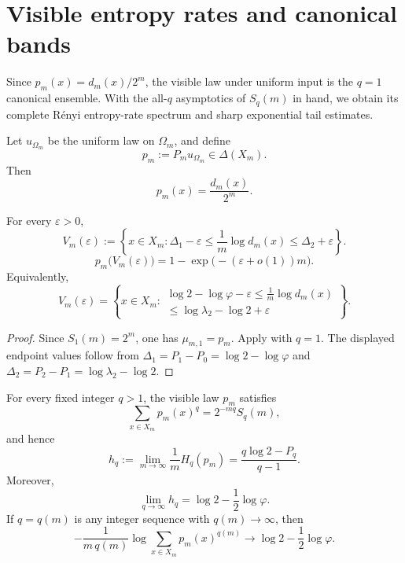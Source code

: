 \section{Visible entropy rates and canonical bands}\label{sec:ledger}

Since \(p_m(x)=d_m(x)/2^m\), the visible law under uniform input is the
\(q=1\) canonical ensemble.  With the all-\(q\) asymptotics of \(S_q(m)\) in
hand, we obtain its complete R\'enyi entropy-rate spectrum
\cite{CoverThomas2006} and sharp exponential tail estimates.

\begin{definition}
\label{def:visible-law}
Let \(u_{\Omega_m}\) be the uniform law on \(\Omega_m\), and define
\[
  p_m:=P_mu_{\Omega_m}\in\Delta(X_m).
\]
Then
\[
  p_m(x)=\frac{d_m(x)}{2^m}.
\]
\end{definition}

\begin{corollary}
\label{cor:visible-band}
For every \(\varepsilon>0\),
\[
  V_m(\varepsilon)
  :=
  \left\{
    x\in X_m:
    \Delta_1-\varepsilon\le \frac1m\log d_m(x)\le \Delta_2+\varepsilon
  \right\}.
\]
\[
  p_m\bigl(V_m(\varepsilon)\bigr)
  =
  1-\exp\bigl(-(\varepsilon+o(1))m\bigr).
\]
Equivalently,
\[
  V_m(\varepsilon)
  =
  \left\{
    x\in X_m:
    \begin{array}{c}
      \log 2-\log\varphi-\varepsilon
      \le
      \frac1m\log d_m(x) \\[2pt]
      \le
      \log\lambda_2-\log 2+\varepsilon
    \end{array}
  \right\}.
\]
\end{corollary}

\begin{proof}
Since \(S_1(m)=2^m\), one has \(\mu_{m,1}=p_m\).  Apply
 with \(q=1\).  The displayed endpoint values follow
from \(\Delta_1=P_1-P_0=\log 2-\log\varphi\) and
\(\Delta_2=P_2-P_1=\log\lambda_2-\log 2\).
\end{proof}

\begin{theorem}
\label{thm:renyi-entropy-rate}
For every fixed integer \(q>1\), the visible law \(p_m\) satisfies
\[
  \sum_{x\in X_m} p_m(x)^q = 2^{-m q} S_q(m),
\]
and hence
\[
  h_q
  :=
  \lim_{m\to\infty}\frac{1}{m}H_q(p_m)
  =
  \frac{q\log 2-P_q}{q-1}.
\]
Moreover,
\[
  \lim_{q\to\infty} h_q
  =
  \log 2-\frac12\log\varphi.
\]
If \(q=q(m)\) is any integer sequence with \(q(m)\to\infty\), then
\[
  -\frac{1}{m\,q(m)}\log \sum_{x\in X_m} p_m(x)^{q(m)}
  \to
  \log 2-\frac12\log\varphi.
\]
\end{theorem}

